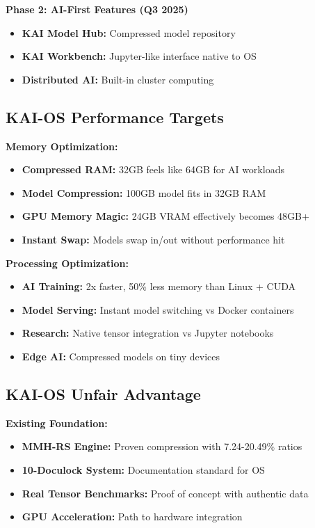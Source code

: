 \documentclass[12pt,a4paper]{article}
\begin{document}
\textbf{Phase 2: AI-First Features (Q3 2025)}
\begin{itemize}
    \item \textbf{KAI Model Hub:} Compressed model repository
    \item \textbf{KAI Workbench:} Jupyter-like interface native to OS
    \item \textbf{Distributed AI:} Built-in cluster computing
\end{itemize}

\subsection{KAI-OS Performance Targets}

\textbf{Memory Optimization:}
\begin{itemize}
    \item \textbf{Compressed RAM:} 32GB feels like 64GB for AI workloads
    \item \textbf{Model Compression:} 100GB model fits in 32GB RAM
    \item \textbf{GPU Memory Magic:} 24GB VRAM effectively becomes 48GB+
    \item \textbf{Instant Swap:} Models swap in/out without performance hit
\end{itemize}

\textbf{Processing Optimization:}
\begin{itemize}
    \item \textbf{AI Training:} 2x faster, 50\% less memory than Linux + CUDA
    \item \textbf{Model Serving:} Instant model switching vs Docker containers
    \item \textbf{Research:} Native tensor integration vs Jupyter notebooks
    \item \textbf{Edge AI:} Compressed models on tiny devices
\end{itemize}

\subsection{KAI-OS Unfair Advantage}

\textbf{Existing Foundation:}
\begin{itemize}
    \item \textbf{MMH-RS Engine:} Proven compression with 7.24-20.49\% ratios
    \item \textbf{10-Doculock System:} Documentation standard for OS
    \item \textbf{Real Tensor Benchmarks:} Proof of concept with authentic data
    \item \textbf{GPU Acceleration:} Path to hardware integration
\end{itemize}
\end{document}
